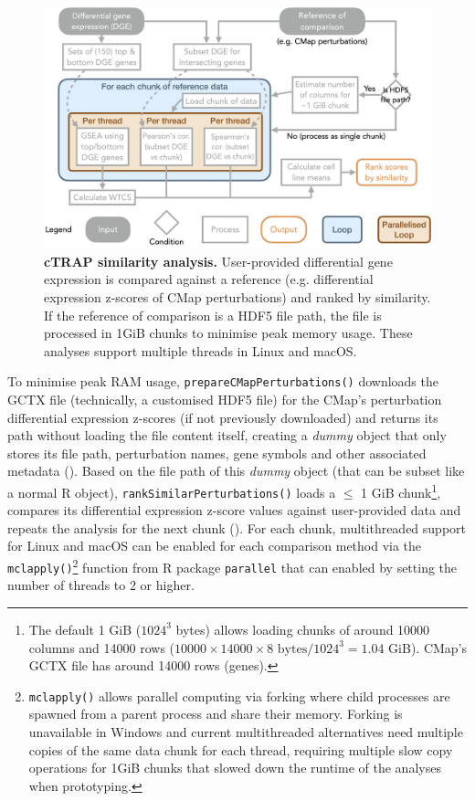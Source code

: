 \begin{figure}[!ht]
  \includegraphics[width=.8\textwidth]{images/ctrap/analysis}
  \centering
  \caption[cTRAP similarity analysis]{\textbf{cTRAP similarity analysis.} User-provided differential gene expression is compared against a reference (e.g. differential expression z-scores of CMap perturbations) and ranked by similarity. If the reference of comparison is a HDF5 file path, the file is processed in 1GiB chunks to minimise peak memory usage. These analyses support multiple threads in Linux and macOS.}
  \label{fig:ctrap-analyses}
\end{figure}

To minimise peak RAM usage, \texttt{prepareCMapPerturbations()} downloads the GCTX file (technically, a customised HDF5 file) for the CMap’s perturbation differential expression z-scores (if not previously downloaded) and returns its path without loading the file content itself, creating a \emph{dummy} object that only stores its file path, perturbation names, gene symbols and other associated metadata (). Based on the file path of this \emph{dummy} object (that can be subset like a normal R object), \texttt{rankSimilarPerturbations()} loads a $\le$ 1 GiB chunk\footnote{The default 1 GiB ($1024^3$ bytes) allows loading chunks of around 10000 columns and 14000 rows ($10000 \times 14000 \times 8 \textrm{ bytes} / 1024^3 = 1.04 \textrm{ GiB}$). CMap's GCTX file has around 14000 rows (genes).}, compares its differential expression z-score values against user-provided data and repeats the analysis for the next chunk (). For each chunk, multithreaded support for Linux and macOS can be enabled for each comparison method via the \texttt{mclapply()}\footnote{\texttt{mclapply()} allows parallel computing via forking where child processes are spawned from a parent process and share their memory. Forking is unavailable in Windows and current multithreaded alternatives need multiple copies of the same data chunk for each thread, requiring multiple slow copy operations for 1GiB chunks that slowed down the runtime of the analyses when prototyping.} function from R package \texttt{parallel} that can enabled by setting the number of threads to 2 or higher.

